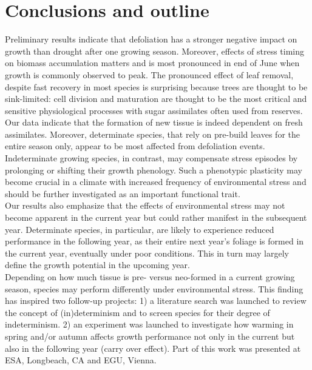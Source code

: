 \documentclass{article}
\begin{document}
	
	
	\section*{Conclusions and outline}
	Preliminary results indicate that defoliation has a stronger negative impact on growth than drought after one growing season. Moreover, effects of stress timing on biomass accumulation matters and is most pronounced in end of June when growth is commonly observed to peak. The pronounced effect of leaf removal, despite fast recovery in most species is surprising because trees are thought to be sink-limited: cell division and maturation are thought to be the most critical and sensitive physiological processes with sugar assimilates often used from reserves. Our data indicate that the formation of new tissue is indeed dependent on fresh assimilates. Moreover, determinate species, that rely on pre-build leaves for the entire season only, appear to be most affected from defoliation events. Indeterminate growing species, in contrast, may compensate stress episodes by prolonging or shifting their growth phenology. Such a phenotypic plasticity may become crucial in a climate with increased frequency of environmental stress and should be further investigated as an important functional trait.\\
	
	Our results also emphasize that the effects of environmental stress may not become apparent in the current year but could rather manifest in the subsequent year. Determinate species, in particular, are likely to experience reduced performance in the following year, as their entire next year's foliage is formed in the current year, eventually under poor conditions. This in turn may largely define the growth potential  in the upcoming year.\\
	
	Depending on how much tissue is pre- versus neo-formed in a current growing season, species may perform differently under environmental stress. This finding has inspired two follow-up projects: 1) a literature search was launched to review the concept of (in)determinism and to screen species for their degree of indeterminism. 2) an experiment was launched to investigate how warming in spring and/or autumn affects growth performance not only in the current but also in the following year (carry over effect). Part of this work was presented at ESA, Longbeach, CA and EGU, Vienna. 
	

	
	
	
	
	
	
	
	
	
	

	
	
	
	
	
	
	
	
	
	
\end{document}
